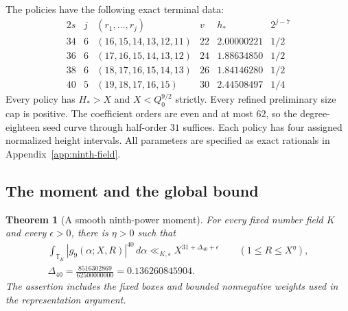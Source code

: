 \documentclass[11pt]{amsart}
\newtheorem{theorem}{Theorem}[section]
\theoremstyle{definition}
\numberwithin{equation}{section}
\begin{document}
The policies have the following exact terminal data:
\[
\begin{array}{c|c|c|c|c|c}
2s&j&(r_1,\ldots,r_j)&v&h_*&2^{j-7}\\\hline
34&6&(16,15,14,13,12,11)&22&2.00000221&1/2\\
36&6&(17,16,15,14,13,12)&24&1.88634850&1/2\\
38&6&(18,17,16,15,14,13)&26&1.84146280&1/2\\
40&5&(19,18,17,16,15)&30&2.44508497&1/4
\end{array}
\]
Every policy has $H_*>X$ and $X<Q_0^{9/2}$ strictly.  Every refined
preliminary size cap is positive.  The coefficient orders are even and
at most $62$, so the degree-eighteen seed curve through half-order $31$
suffices.  Each policy has four assigned normalized height intervals.
All parameters are specified as exact rationals in Appendix~\ref{app:ninth-field}.

\subsection{The moment and the global bound}
\label{sec:ninth-global}
\begin{theorem}[A smooth ninth-power moment]
\label{thm:ninth-moment}
For every fixed number field $K$ and every $\epsilon>0$, there is
$\eta>0$ such that
\[
 \begin{gathered}
 \int_{\mathbb T_K}|g_9(\alpha;X,R)|^{40}\,d\alpha
       \ll_{K,\epsilon}X^{31+\Delta_{40}+\epsilon}
       \qquad(1\le R\le X^\eta),\\
 \Delta_{40}=\frac{8516302869}{62500000000}
            =0.136260845904.
 \end{gathered}
\]
The assertion includes the fixed boxes and bounded nonnegative weights
used in the representation argument.
\end{theorem}
\end{document}
